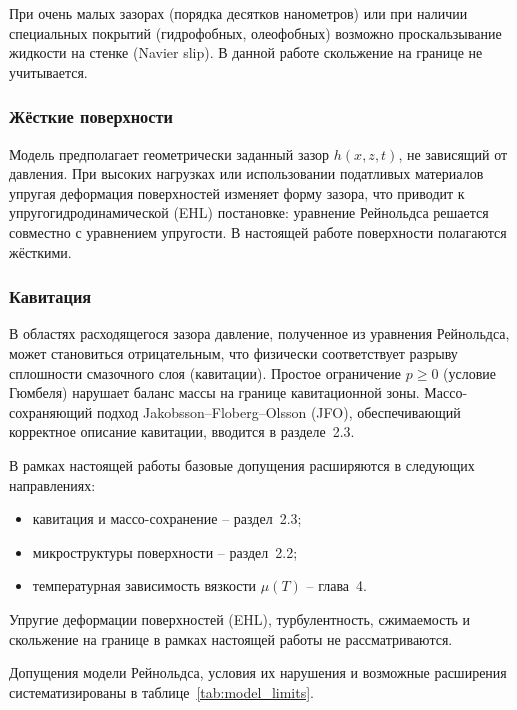При очень малых зазорах (порядка десятков нанометров) или при наличии специальных покрытий (гидрофобных, олеофобных) возможно проскальзывание жидкости на стенке (Navier slip). В данной работе скольжение на границе не учитывается.

\subsubsection*{Жёсткие поверхности}

Модель предполагает геометрически заданный зазор $h(x, z, t)$, не зависящий от давления. При высоких нагрузках или использовании податливых материалов упругая деформация поверхностей изменяет форму зазора, что приводит к упругогидродинамической (EHL) постановке: уравнение Рейнольдса решается совместно с уравнением упругости. В настоящей работе поверхности полагаются жёсткими.

\subsubsection*{Кавитация}

В областях расходящегося зазора давление, полученное из уравнения Рейнольдса, может становиться отрицательным, что физически соответствует разрыву сплошности смазочного слоя (кавитации). Простое ограничение $p \geq 0$ (условие Гюмбеля) нарушает баланс массы на границе кавитационной зоны. Массо-сохраняющий подход Jakobsson--Floberg--Olsson (JFO), обеспечивающий корректное описание кавитации, вводится в разделе~2.3.

В рамках настоящей работы базовые допущения расширяются в следующих направлениях:
\begin{itemize}
  \item кавитация и массо-сохранение -- раздел~2.3;
  \item микроструктуры поверхности -- раздел~2.2;
  \item температурная зависимость вязкости $\mu(T)$ -- глава~4.
\end{itemize}
Упругие деформации поверхностей (EHL), турбулентность, сжимаемость и скольжение на границе в рамках настоящей работы не рассматриваются.

Допущения модели Рейнольдса, условия их нарушения и возможные
расширения систематизированы
в таблице~\ref{tab:model_limits}.

